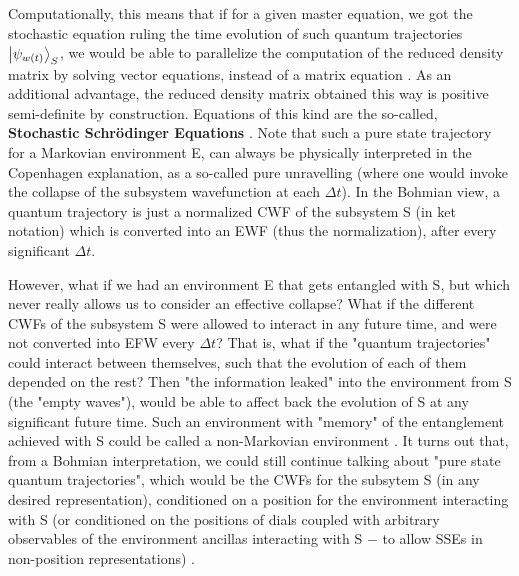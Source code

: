 \documentclass[11pt, a4paper]{article} %
\begin{document}
Computationally, this means that if for a given master equation, we got the stochastic equation ruling the time evolution of such quantum trajectories $\ket{\psi_{w(t)}}_S$, we would be able to parallelize the computation of the reduced density matrix by solving vector equations, instead of a matrix equation \cite{MarkovianityDefs, QuantumTrajs}. As an additional advantage, the reduced density matrix obtained this way is positive semi-definite by construction. Equations of this kind are the so-called, {\bf Stochastic Schrödinger Equations} \cite{Generalized, continousMeas}. Note that such a pure state trajectory for a Markovian environment E, can always be physically interpreted in the Copenhagen explanation, as a so-called pure unravelling \cite{MarkovianityDefs} (where one would invoke the collapse of the subsystem wavefunction at each $\Delta t$). In the Bohmian view, a quantum trajectory is just a normalized CWF of the subsystem S (in ket notation) which is converted into an EWF (thus the normalization), after every significant $\Delta t$.\vspace{-0.05cm}
 

However, what if we had an environment E that gets entangled with S, but which never really allows us to consider an effective collapse? What if the different CWFs of the subsystem S were allowed to interact in any future time, and were not converted into EFW every $\Delta t$? That is, what if the "quantum trajectories" could interact between themselves, such that the evolution of each of them depended on the rest? Then "the information leaked" into the environment from S (the "empty waves"), would be able to affect back the evolution of S at any significant future time. Such an environment with "memory" of the entanglement achieved with S could be called a non-Markovian environment \cite{MarkovianityDefs}. It turns out that, from a Bohmian interpretation, we could still continue talking about "pure state quantum trajectories", which would be the CWFs for the subsytem S (in any desired representation), conditioned on a position for the environment interacting with S (or conditioned on the positions of dials coupled with arbitrary observables of the environment ancillas interacting with S $-$ to allow SSEs in non-position representations) \cite{NMisModal, interpretSSE}.
\vspace{-0.05cm}
\end{document}
